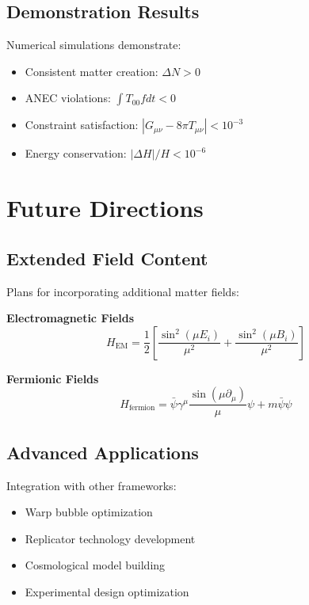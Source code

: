 \documentclass[11pt]{article}
\begin{document}
\subsection{Demonstration Results}

Numerical simulations demonstrate:
\begin{itemize}
\item Consistent matter creation: $\Delta N > 0$
\item ANEC violations: $\int T_{00} f dt < 0$
\item Constraint satisfaction: $|G_{\mu\nu} - 8\pi T_{\mu\nu}| < 10^{-3}$
\item Energy conservation: $|\Delta H|/H < 10^{-6}$
\end{itemize}

\section{Future Directions}

\subsection{Extended Field Content}

Plans for incorporating additional matter fields:

\textbf{Electromagnetic Fields}
\begin{equation}
H_{\text{EM}} = \frac{1}{2}\left[\frac{\sin^2(\mu E_i)}{\mu^2} + \frac{\sin^2(\mu B_i)}{\mu^2}\right]
\end{equation}

\textbf{Fermionic Fields}
\begin{equation}
H_{\text{fermion}} = \bar{\psi}\gamma^\mu \frac{\sin(\mu \partial_\mu)}{\mu}\psi + m\bar{\psi}\psi
\end{equation}

\subsection{Advanced Applications}

Integration with other frameworks:
\begin{itemize}
\item Warp bubble optimization
\item Replicator technology development  
\item Cosmological model building
\item Experimental design optimization
\end{itemize}
\end{document}
